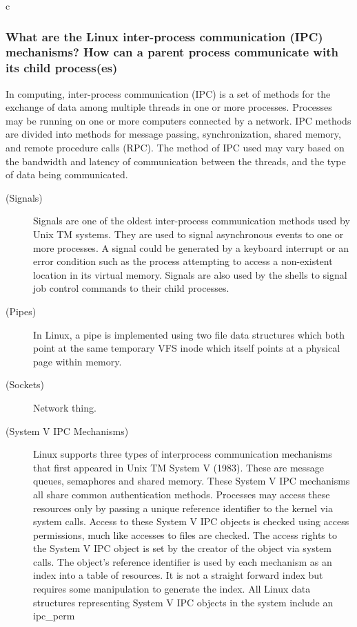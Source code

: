 \documentclass{article}
\begin{document}
\begin{mitned}{c}
\subsubsection{What are the Linux inter-process communication (IPC) mechanisms? How can a parent
process communicate with its child process(es)}
\textsf{In computing, inter-process communication (IPC) is a set of methods for the exchange of data among multiple threads 
in one or more processes. Processes may be running on one or more computers connected by a network. IPC methods are divided 
into methods for message passing, synchronization, shared memory, and remote procedure calls (RPC). The method of IPC used 
may vary based on the bandwidth and latency of communication between the threads, and the type of data being communicated.}
\begin{description}
\item[(Signals)] Signals are one of the oldest inter-process communication methods used by Unix TM systems. They are used to 
signal asynchronous events to one or more processes. A signal could be generated by a keyboard interrupt or an error condition such 
as the process attempting to access a non-existent location in its virtual memory. Signals are also used by the shells to signal 
job control commands to their child processes.
\item[(Pipes)] In Linux, a pipe is implemented using two file data structures which both point at the same temporary VFS inode 
which itself points at a physical page within memory. 
\item[(Sockets)] Network thing.
\item[(System V IPC Mechanisms)] Linux supports three types of interprocess communication mechanisms that first appeared in 
Unix TM System V (1983). These are message queues, semaphores and shared memory. These System V IPC mechanisms all share common authentication methods. 
Processes may access these resources only by passing a unique reference identifier to the kernel via system calls. Access to these System V 
IPC objects is checked using access permissions, much like accesses to files are checked. The access rights to the System V IPC object is set by the 
creator of the object via system calls. The object's reference identifier is used by each mechanism as an index into a table of resources. 
It is not a straight forward index but requires some manipulation to generate the index.
All Linux data structures representing System V IPC objects in the system include an ipc\_perm


\end{description}
\end{mitned}
\end{document}
